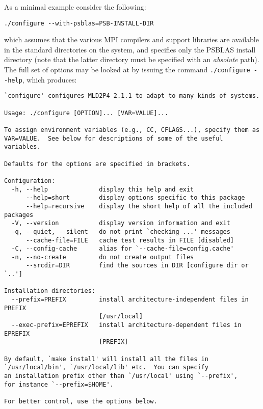 As a minimal example consider the following:
\begin{verbatim}
./configure --with-psblas=PSB-INSTALL-DIR
\end{verbatim}
which assumes that the various MPI compilers and support libraries are
available in the standard directories on the system, and specifies
only the PSBLAS install  directory (note that the latter directory must
be specified with an {\em absolute} path).
The full set of options may be looked at by issuing the command
\verb|./configure --help|, which produces:
\begin{verbatim}
`configure' configures MLD2P4 2.1.1 to adapt to many kinds of systems.

Usage: ./configure [OPTION]... [VAR=VALUE]...

To assign environment variables (e.g., CC, CFLAGS...), specify them as
VAR=VALUE.  See below for descriptions of some of the useful variables.

Defaults for the options are specified in brackets.

Configuration:
  -h, --help              display this help and exit
      --help=short        display options specific to this package
      --help=recursive    display the short help of all the included packages
  -V, --version           display version information and exit
  -q, --quiet, --silent   do not print `checking ...' messages
      --cache-file=FILE   cache test results in FILE [disabled]
  -C, --config-cache      alias for `--cache-file=config.cache'
  -n, --no-create         do not create output files
      --srcdir=DIR        find the sources in DIR [configure dir or `..']

Installation directories:
  --prefix=PREFIX         install architecture-independent files in PREFIX
                          [/usr/local]
  --exec-prefix=EPREFIX   install architecture-dependent files in EPREFIX
                          [PREFIX]

By default, `make install' will install all the files in
`/usr/local/bin', `/usr/local/lib' etc.  You can specify
an installation prefix other than `/usr/local' using `--prefix',
for instance `--prefix=$HOME'.

For better control, use the options below.


\end{verbatim}
